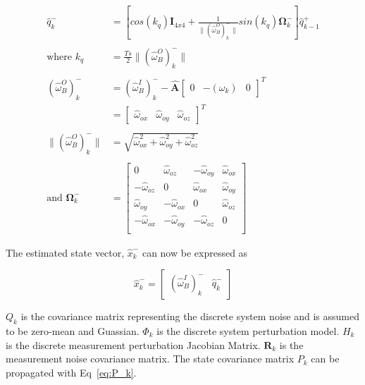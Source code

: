 \documentclass[letterpaper, 10 pt, conference]{ieeeconf}  %
\begin{document}
\begin{equation}
\begin{aligned}
	\hat{q}_k^- &= \left[cos(k_q)\mathbf{I}_{4x4} + \frac{1}{\lVert (\hat{\omega}_B^O)_k^- \rVert} sin(k_q) \mathbf{\Omega}_k^- \right] \hat{q}_{k-1}^+ \\ \\
	\text{where } k_q &= \frac{Ts}{2} \lVert (\hat{\omega}_B^O)_k^- \rVert \\ \\
	(\hat{\omega}_B^O)_k^- &= (\hat{\omega}_B^I)_k^- - \hat{\mathbf{A}} \begin{bmatrix} 0 & -(\omega_k) & 0\end{bmatrix}^T \\
	&= \begin{bmatrix} \hat{\omega}_{ox} & \hat{\omega}_{oy}  & \hat{\omega}_{oz} \end{bmatrix}^T \\ \\
	\lVert (\hat{\omega}_B^O)_k^- \rVert &= \sqrt{\hat{\omega}_{ox}^2 + \hat{\omega}_{oy}^2 + \hat{\omega}_{oz}^2} \\ \\
	\text{and } \mathbf{\Omega}_k^- &= \begin{bmatrix} 
										0 & \hat{\omega}_{oz} & -\hat{\omega}_{oy} & \hat{\omega}_{ox} \\
										-\hat{\omega}_{oz} & 0 & \hat{\omega}_{ox} & \hat{\omega}_{oy}			\\
										\hat{\omega}_{oy} & -\hat{\omega}_{ox} & 0 & \hat{\omega}_{oz}			\\
										-\hat{\omega}_{ox} & -\hat{\omega}_{oy} & -\hat{\omega}_{oz} & 0			\\
										\end{bmatrix}
\end{aligned}
\label{eq:q-propagation}
\end{equation}

The estimated state vector, $\hat{x}_k^-$ can now be expressed as 

\begin{equation}
\hat{x}_k^- = \begin{bmatrix} (\hat{\omega}_B^I)_k^- & \hat{q}_k^-\end{bmatrix}
\end{equation}

$Q_k$ is the covariance matrix representing the discrete system noise and is assumed to be zero-mean and Guassian. $\Phi_k$ is the discrete system perturbation model. $H_k$ is the discrete measurement perturbation Jacobian Matrix. $\mathbf{R}_k$ is the measurement noise covariance matrix. The state covariance matrix $P_k$ can be propagated with Eq~\ref{eq:P_k}.
\end{document}
